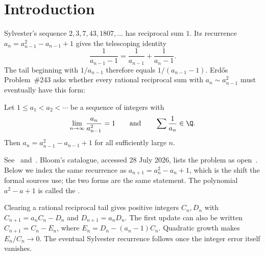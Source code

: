 \maketitle
\noteprovenance

\begin{abstract}
We study rational reciprocal sums with $a_{n+1}/a_n^2\to1$.
Integer finite differences exclude nonintegral regular rates and reduce
the cubic rate to a polynomial. A square condition in the cubic field
and congruences modulo seven then prove irrationality.
For general rational tails, we derive Sylvester recurrence criteria
from persistent divisors, bounded numerator increases and weighted
crossings of new maxima. We describe the arithmetic estimates still
needed for Erd\H{o}s Problem~\#243.
\end{abstract}

\section{Introduction}\label{long243:sec:problem}
Sylvester's sequence $2,3,7,43,1807,\ldots$ has reciprocal sum $1$.
Its recurrence $a_n=a_{n-1}^2-a_{n-1}+1$ gives the telescoping identity
\[
 \frac1{a_{n-1}-1}=\frac1{a_{n-1}}+\frac1{a_n-1}.
\]
The tail beginning with $1/a_{n-1}$ therefore equals $1/(a_{n-1}-1)$.
Erd\H{o}s Problem~\#243 asks whether every rational reciprocal sum
with $a_n\sim a_{n-1}^2$ must eventually have this form:

\begin{problem}[Erd\H{o}s \#243]\label{long243:res:problem}
Let $1\le a_1<a_2<\cdots$ be a sequence of integers with
\[
 \lim_{n\to\infty}\frac{a_n}{a_{n-1}^{2}}=1
 \qquad\text{and}\qquad
 \sum\frac{1}{a_n}\in\Q .
\]
Then $a_n=a_{n-1}^{2}-a_{n-1}+1$ for all sufficiently large $n$.
\end{problem}

\noindent See~\cite[p.~64]{erdosgraham1980} and~\cite[p.~105]{erdos1988}.
Bloom's catalogue, accessed 28 July 2026, lists the problem as
open~\cite{erdosproblems}.
Below we index the same recurrence as
$a_{n+1}=a_n^{2}-a_n+1$, which is the shift the formal sources use; the two
forms are the same statement. The polynomial $a^2-a+1$ is called the
.

Clearing a rational reciprocal tail gives positive integers $C_n,D_n$
with $C_{n+1}=a_nC_n-D_n$ and $D_{n+1}=a_nD_n$. The first update
can also be written $C_{n+1}=C_n-E_n$, where
$E_n=D_n-(a_n-1)C_n$. Quadratic growth makes $E_n/C_n\to0$.
The eventual Sylvester recurrence follows once the integer error itself
vanishes.

